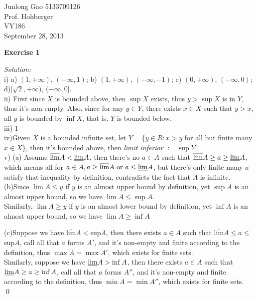 \documentclass[12pt]{article}
\begin{document}
\begin{flushleft}
Junlong Gao 5133709126\\
Prof. Hohberger\\
VY186\\
September 28, 2013\\%
\end{flushleft}


\textbf{Exercise 1}\par
\textit{Solution:}\\
i) a) $(1,+\infty)$, $(-\infty,1)$; b) $(1,+\infty)$, $(-\infty, -1)$; c) $(0,+\infty)$, $(-\infty,0)$; d)$[\sqrt{2},+\infty)$, $(-\infty, 0]$.\\
ii) First since $X$ is bounded above, then $\sup X$ exists, thus  $y>\sup X$ is in $Y$, thus it's non-empty. Also, since for any $y\in Y$, there exists $x\in X$ such that $y>x$, all $y$ is bounded by $\inf X$, that is, $Y$ is bounded below.\\
iii) 1\\
iv)Given $X$ is a bounded infinite set, let $Y=\{y\in R: x>y $ for all but finite many $ x\in X\}$, then it's bounded above, then \textit{limit inferior} $:=\sup Y$\\
v) (a) Assume $\overline{\text{lim}}A < \uline{\text{lim}}A$, then there's no $a\in A$ such that $\overline{\text{lim}}A \ge a\ge \uline{\text{lim}}A$, which means all for $a\in A, a\ge\overline{\text{lim}}A \text{ or } a\leq \uline{\text{lim}}A$, but there's only finite many $a$ satisfy that inequality by definition, contradicts the fact that $A$ is infinite.\\
(b)Since $\overline{\lim}A\leq y$ if $y$ is an almost upper bound by definition, yet $\sup A$ is an almost upper bound, so we have $\overline{\lim}A\leq\sup A$.\\
Similarly, $\underline{\lim}A\ge y$ if $y$ is an almost lower bound by definition, yet $\inf A$ is an almost upper bound, so we have $\underline{\lim}A\ge \inf A$\par
(c)Suppose we have $\overline{\text{lim}}A<$sup$A$, then there exists $a\in A$ such that $\overline{\text{lim}}A\leq a\leq $sup$A$, call all that $a$ forms $A'$, and it's non-empty and finite according to the definition, thus $\max A=\max A'$, which exists for finite sets.\\
Similarly, suppose we have $\uline{\lim}A>\inf A$, then there exists $a\in A$ such that $\uline{\lim}A\ge a\ge \inf A$, call all that $a$ forms $A''$, and it's non-empty and finite according to the definition, thus $\min A=\min A''$, which exists for finite sets.\\
\qed\par
\end{document}
